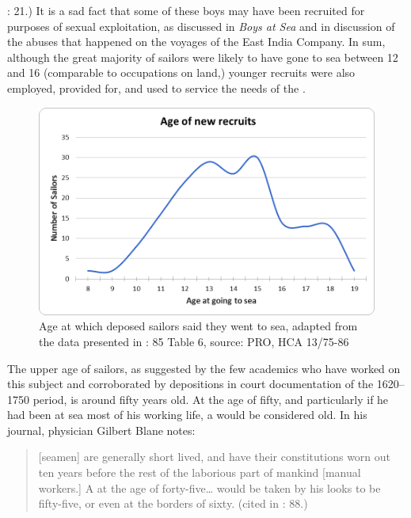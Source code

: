 \citealt{AdkinsAdkins2008}: 21.) It is a sad fact that some of these boys may have been recruited for purposes of sexual exploitation, as discussed in  \textit{Boys at Sea} and in  discussion of the abuses that happened on the voyages of the East India Company. In sum, although the great majority of sailors were likely to have gone to sea between 12 and 16 (comparable to occupations on land,) younger recruits were also employed, provided for, and used to service the needs of the .


\begin{figure}

\caption{\label{fig:key:3.1}Age at which deposed sailors said they went to sea, adapted from the data presented in \citealt{Earle1998}: 85 Table 6, source: PRO, HCA 13/75-86}
\includegraphics[width=\textwidth]{figures/delgado-img2.png}
\end{figure}

The upper age of sailors, as suggested by the few academics who have worked on this subject and corroborated by depositions in court documentation of the 1620--1750 period, is around fifty years old. At the age of fifty, and particularly if he had been at sea most of his working life, a  would be considered old.  In his journal, physician Gilbert Blane notes:

\begin{quotation}
[seamen] are generally short lived, and have their constitutions worn out ten years before the rest of the laborious part of mankind [manual workers.] A  at the age of forty-five… would be taken by his looks to be fifty-five, or even at the borders of sixty. (cited in \citealt{AdkinsAdkins2008}: 88.) \end{quotation}

